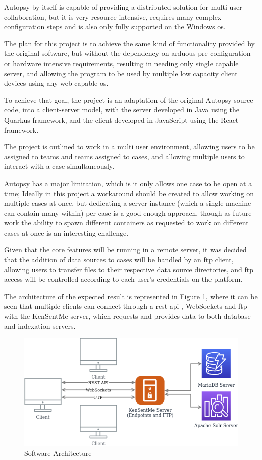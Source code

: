 Autopsy by itself is capable of providing a distributed solution for multi user collaboration, but it is very resource intensive, requires many complex configuration steps
and is also only fully supported on the Windows \acrshort{os}.

The plan for this project is to achieve the same kind of functionality provided by the original software, but without the dependency on arduous pre-configuration
or hardware intensive requirements, resulting in needing only single capable server, and allowing the program to be used by multiple low capacity client devices using 
any web capable \acrshort{os}.

To achieve that goal, the project is an adaptation of the original Autopsy source code, into a client-server model, with the server developed in Java \cite{java} using the Quarkus \cite{quarkus} framework,
and the client developed in JavaScript \cite{javascript} using the React \cite{react} framework.

The project is outlined to work in a multi user environment, allowing users to be assigned to teams and teams assigned to cases, and allowing multiple users to interact with
a case simultaneously.

Autopsy has a major limitation, which is it only allows one case to be open at a time; Ideally in this project a workaround should be created to allow working on multiple cases
at once, but dedicating a server instance (which a single machine can contain many within) per case is a good enough approach, though as future work the
ability to spawn different containers as requested to work on different cases at once is an interesting challenge.

Given that the core features will be running in a remote server, it was decided that the addition of data sources to cases will be handled by an \acrshort{ftp} \cite{ftp} client, allowing users
to transfer files to their respective data source directories, and \acrshort{ftp} access will be controlled according to each user's credentials on the platform.

The architecture of the expected result is represented in Figure \ref{fig:arch}, where it can be seen that multiple clients can connect through a \acrshort{rest} \acrshort{api} \cite{rest}, WebSockets and \acrshort{ftp} with the KenSentMe server, 
which requests and provides data to both database and indexation servers.

\begin{figure}[ht]
 \centering
 \includegraphics[width=0.75\linewidth]{imgs/arch.png}
 \caption{Software Architecture}
 \label{fig:arch}
\end{figure}


